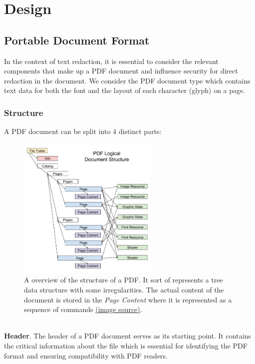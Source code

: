 \chapter{Design}

\section{Portable Document Format}
In the context of text redaction, it is essential to consider the relevant components that make up a PDF document and influence security for direct redaction in the document. We consider the PDF document type which contains text data for both the font and the layout of each character (glyph) on a page. 

\subsection{Structure}
A PDF document can be split into 4 distinct parts: 
    \begin{figure}[h]
    \includegraphics[width=0.6\textwidth]{latex/media/pdfstructure.png}
    \centering
    \caption{A overview of the structure of a PDF. It sort of represents a tree data structure with some irregularities. The actual content of the document is stored in the \textit{Page Content} where it is represented as a sequence of commands \href{https://skia.org/docs/dev/design/pdftheory/}{(image source)}.}
    \label{fig:tjexample}
\end{figure}\\
\textbf{Header}. The header of a PDF document serves as its starting point. It contains the critical information about the file which is essential for identifying the PDF format and ensuring compatibility with PDF readers. \\
